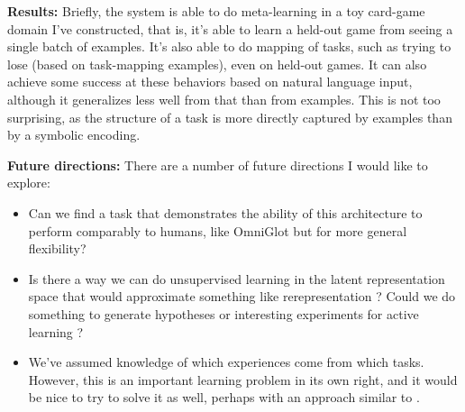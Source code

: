 \documentclass[11pt]{article}
\begin{document}
\textbf{Results:} Briefly, the system is able to do meta-learning in a toy card-game domain I've constructed, that is, it's able to learn a held-out game from seeing a single batch of examples. It's also able to do mapping of tasks, such as trying to lose (based on task-mapping examples), even on held-out games. It can also achieve some success at these behaviors based on natural language input, although it generalizes less well from that than from examples. This is not too surprising, as the structure of a task is more directly captured by examples than by a symbolic encoding. \par 
\textbf{Future directions:}
There are a number of future directions I would like to explore:
\begin{itemize}
\item Can we find a task that demonstrates the ability of this architecture to perform comparably to humans, like OmniGlot \citep{Lake2015} but for more general flexibility?
\item Is there a way we can do unsupervised learning in the latent representation space that would approximate something like rerepresentation \citep{Karmiloff-Smith1986}? Could we do something to generate hypotheses or interesting experiments for active learning \citep{Markant2014a}? 
\item We've assumed knowledge of which experiences come from which tasks. However, this is an important learning problem in its own right, and it would be nice to try to solve it as well, perhaps with an approach similar to \citep{Achille2018}. 
\end{itemize}
\end{document}

